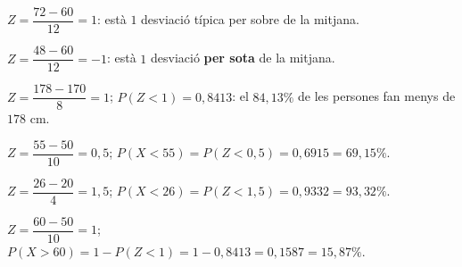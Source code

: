\begin{solucions}
\begin{sollist}
  \item $Z=\dfrac{72-60}{12}=1$: està $1$ desviació típica per sobre de la mitjana.
  \item $Z=\dfrac{48-60}{12}=-1$: està $1$ desviació \textbf{per sota} de la mitjana.
  \item $Z=\dfrac{178-170}{8}=1$; $P(Z<1)=0,8413$: el $84,13\%$ de les persones fan menys
        de $178$ cm.
  \item $Z=\dfrac{55-50}{10}=0,5$; $P(X<55)=P(Z<0,5)=0,6915=69,15\%$.
  \item $Z=\dfrac{26-20}{4}=1,5$; $P(X<26)=P(Z<1,5)=0,9332=93,32\%$.
  \item $Z=\dfrac{60-50}{10}=1$; $P(X>60)=1-P(Z<1)=1-0,8413=0,1587=15,87\%$.
\end{sollist}
\end{solucions}
